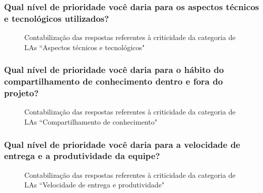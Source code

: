 \subsubsection{Qual nível de prioridade você daria para os aspectos técnicos e tecnológicos utilizados?}

\begin{figure}[H]
	\centering
	\captionsetup{justification=centering}
	\caption{Contabilização das respostas referentes à criticidade da categoria de LAs ``Aspectos técnicos e tecnológicos"}
	\label{fig:result-tech}
\end{figure}

\subsubsection{Qual nível de prioridade você daria para o hábito do compartilhamento de conhecimento dentro e fora do projeto?}

\begin{figure}[H]
	\centering
	\captionsetup{justification=centering}
	\caption{Contabilização das respostas referentes à criticidade da categoria de LAs ``Compartilhamento de conhecimento"}
	\label{fig:result-conhecimento}
\end{figure}

\subsubsection{Qual nível de prioridade você daria para a velocidade de entrega e a produtividade da equipe?}

\begin{figure}[H]
	\centering
	\captionsetup{justification=centering}
	\caption{Contabilização das respostas referentes à criticidade da categoria de LAs ``Velocidade de entrega e produtividade"}
	\label{fig:result-produtividade}
\end{figure}

